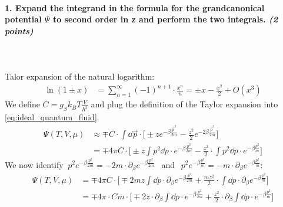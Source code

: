 \paragraph{1. Expand the integrand in the formula for the 
    grandcanonical potential $\Psi$ to second order in z 
    and perform the two integrals. \textit{(2 points)}
} \ \\
    \\
    Talor expansion of the natural logarithm:
    \begin{align}
        \ln(1\pm x)
        &=\sum_{n=1}^\infty(-1)^{n+1}\cdot\frac{x^n}{n}
        =\pm x-\frac{x^2}{2}+O(x^3) 
    \end{align}
    We define $C=g_Sk_BT\frac{V}{h^3}$ and plug the 
    definition of the Taylor expansion into 
    \autoref{eq:ideal_quantum_fluid}.
    \begin{align}
        \Psi(T,V,\mu)
        &\approx\mp C\cdot
        \int\dd\vec p\cdot\bigg[
            \pm ze^{-\beta\frac{\vec p^2}{2m}}
            -\frac{z^2}{2}e^{-2\beta\frac{\vec p^2}{2m}}
        \bigg] \\
        &=\mp 4\pi C\cdot\bigg[
            \pm z\int p^2\dd p\cdot
                e^{-\beta\frac{p^2}{2m}}
            -\frac{z^2}{2}\cdot\int p^2\dd p\cdot
                e^{-\beta\frac{p^2}{m}}
        \bigg]
    \end{align}
    We now identify $\ p^2e^{-\beta\frac{p^2}{2m}}
    =-2m\cdot\partial_\beta e^{-\beta\frac{p^2}{2m}}\ \ $
    and $\ \ p^2e^{-\beta\frac{p^2}{m}}
    =-m\cdot\partial_\beta e^{-\beta\frac{p^2}{m}}$:
    \begin{align}
        \Psi(T,V,\mu)
        &=\mp 4\pi C\cdot\bigg[
            \mp2mz\int \dd p\cdot\partial_\beta
                e^{-\beta\frac{p^2}{2m}}
            +\frac{mz^2}{2}\cdot\int \dd p\cdot\partial_\beta
                e^{-\beta\frac{p^2}{m}}
        \bigg] \\
        &=\mp 4\pi\cdot Cm\cdot\bigg[
            \mp2z\cdot\partial_\beta\int \dd p\cdot
                e^{-\beta\frac{p^2}{2m}}
            +\frac{z^2}{2}\cdot\partial_\beta\int \dd p\cdot
                e^{-\beta\frac{p^2}{m}}
        \bigg]
    \end{align}
